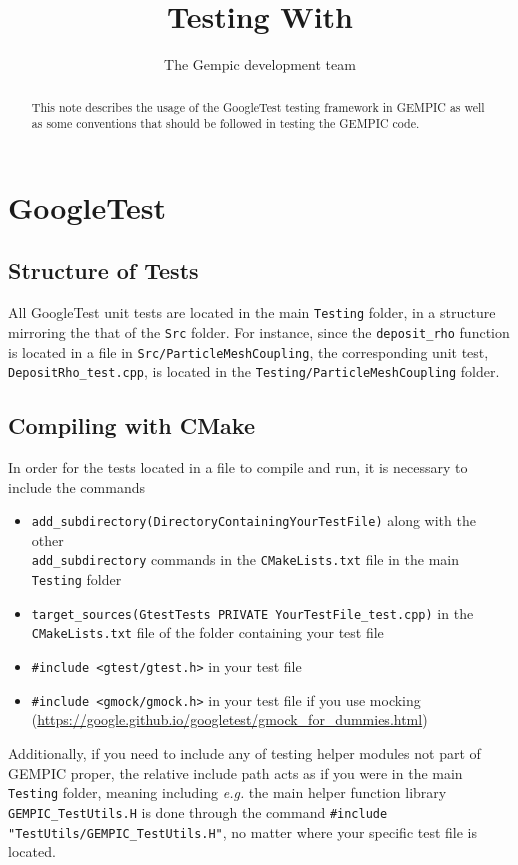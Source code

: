 \documentclass[11pt]{article}
\title{Testing With \gt}
\author[1]{The Gempic development team}
\affil[1]{Max-Planck-Institut f\"ur Plasmaphysik, Garching, Germany}
\newcommand{\gt}{GoogleTest}
\newcommand{\pmc}{\texttt{Testing/ParticleMeshCoupling}}
\newcommand{\main}{main \texttt{Testing}}
\newcommand\loc[1]{in the #1 folder}
\begin{document}
\maketitle

\begin{abstract}
This note describes the usage of the \gt{} testing framework in GEMPIC as well as some conventions that should be followed in testing the GEMPIC code.
\end{abstract}

\tableofcontents

\section{GoogleTest}
\subsection{Structure of Tests}
All \gt{} unit tests are located \loc{\main}, in a structure mirroring the that of the \verb|Src| folder. For instance, since the \verb|deposit_rho| function is located in a file in \verb|Src/ParticleMeshCoupling|, the corresponding unit test, \verb|DepositRho_test.cpp|, is located \loc{\pmc}. 

\subsection{Compiling with CMake}
In order for the tests located in a file to compile and run, it is necessary to include the commands
\begin{itemize}
    \item \verb|add_subdirectory(DirectoryContainingYourTestFile)| along with the other\\
    \verb|add_subdirectory| commands in the \verb|CMakeLists.txt| file \loc{\main{}}
    \item \verb|target_sources(GtestTests PRIVATE YourTestFile_test.cpp)| in the \verb|CMakeLists.txt| file of the folder containing your test file
    \item \lstinline{#include <gtest/gtest.h>} in your test file
    \item \lstinline{#include <gmock/gmock.h>} in your test file if you use mocking (\url{https://google.github.io/googletest/gmock_for_dummies.html})
\end{itemize}
Additionally, if you need to include any of testing helper modules not part of GEMPIC proper, the relative include path acts as if you were \loc{\main}, meaning including \emph{e.g.} the main helper function library \verb|GEMPIC_TestUtils.H| is done through the command \lstinline{#include "TestUtils/GEMPIC_TestUtils.H"}, no matter where your specific test file is located.
\end{document}
